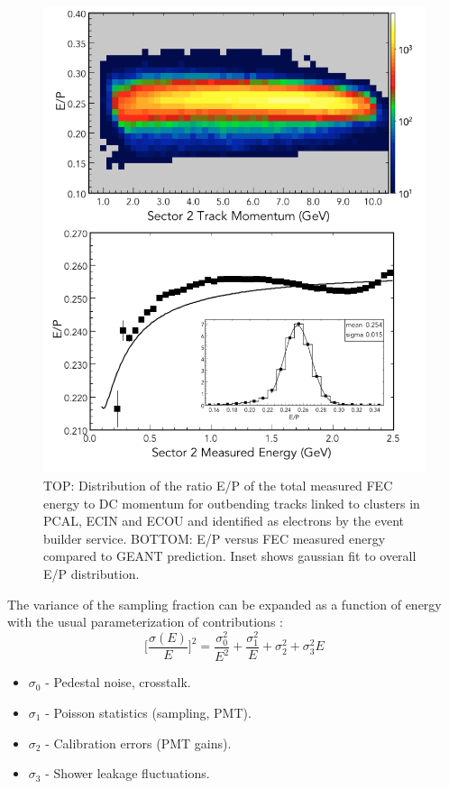 \begin{figure}[hbt]
\centering
\includegraphics[width=1.0\columnwidth,keepaspectratio]{img/S10_1_0.png}
\caption[]{TOP: Distribution of the ratio E/P of the total measured FEC energy to DC momentum for outbending tracks linked to clusters in PCAL, ECIN and ECOU and identified as electrons by the event builder service.  BOTTOM: E/P versus FEC measured energy compared to GEANT prediction.  Inset shows gaussian fit to overall E/P distribution.}
\label{fig:S10_1_0}
\end{figure}

The variance of the sampling fraction can be expanded as a function of energy with the usual parameterization of contributions \cite{ps1981}:
\begin{equation}
\biggl[\frac{\sigma(E)}{E}\biggr]^2 = \frac{\sigma^2_0}{E^2} + \frac{\sigma^2_1}{E} +\sigma^2_2 + \sigma^2_3 E 
\end{equation}

\begin{itemize}
\item $\sigma_0$ - Pedestal noise, crosstalk.
\item $\sigma_1$ - Poisson statistics (sampling, PMT).
\item $\sigma_2$ - Calibration errors (PMT gains).
\item $\sigma_3$ - Shower leakage fluctuations.
\end{itemize}

